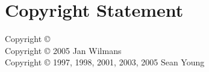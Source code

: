 \documentclass[12pt,twoside,openright,a4paper]{book}
\begin{document}
\frontmatter






\title{\BookTitle}
\author{\AuthorNameSurname}
\date{Version \LatestVersion, \today}

\maketitle

\afterpage{\aftergroup\restoregeometry}


\chapter*{Copyright Statement}

Copyright {\copyright} \LatestYear ~\AuthorNameSurname\\	%
Copyright {\copyright} 2005 Jan Wilmans\\
Copyright {\copyright} 1997, 1998, 2001, 2003, 2005 Sean Young
\end{document}
